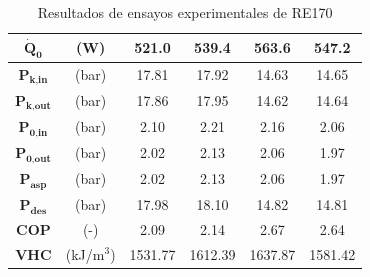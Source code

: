 \documentclass[../main.tex]{subfiles}
\begin{document}
\begin{table}[ht]
\begin{tabular}{cc|c|c|c|c|}
\hline
\multicolumn{1}{|c}{$\dot{\textbf{Q}}_\textbf{0}$} & (W) & 521.0 & 539.4 & 563.6 & 547.2 \\
\hline
\multicolumn{1}{|c}{$\textbf{P}_\textbf{k,in}$} & (bar) & 17.81 & 17.92 & 14.63 & 14.65 \\
\hline
\multicolumn{1}{|c}{$\textbf{P}_\textbf{k,out}$} & (bar) & 17.86 & 17.95 & 14.62 & 14.64 \\
\hline
\multicolumn{1}{|c}{$\textbf{P}_\textbf{0,in}$} & (bar) & 2.10 & 2.21 & 2.16 & 2.06 \\
\hline
\multicolumn{1}{|c}{$\textbf{P}_\textbf{0,out}$} & (bar) & 2.02 & 2.13 & 2.06 & 1.97 \\
\hline
\multicolumn{1}{|c}{$\textbf{P}_\textbf{asp}$} & (bar) & 2.02 & 2.13 & 2.06 & 1.97 \\
\hline
\multicolumn{1}{|c}{$\textbf{P}_\textbf{des}$} & (bar) & 17.98 & 18.10 & 14.82 & 14.81 \\
\hline
\multicolumn{1}{|c}{$\textbf{COP}$} & (-) & 2.09 & 2.14 & 2.67 & 2.64 \\
\hline
\multicolumn{1}{|c}{$\textbf{VHC}$} & (kJ/m$^3$) & 1531.77 & 1612.39 & 1637.87 & 1581.42 \\
\hline
\end{tabular}
\caption{\centering Resultados de ensayos experimentales de RE170}
\label{tab:RE170_anexo}
\end{table}
\end{document}
